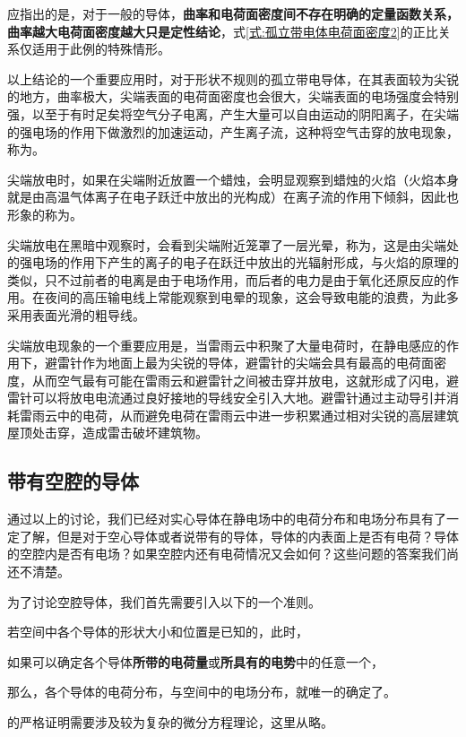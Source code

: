 应指出的是，对于一般的导体，\textbf{曲率和电荷面密度间不存在明确的定量函数关系，曲率越大电荷面密度越大只是定性结论}，式\ref{式:孤立带电体电荷面密度2}的正比关系仅适用于此例的特殊情形。

以上结论的一个重要应用时，对于形状不规则的孤立带电导体，在其表面较为尖锐的地方，曲率极大，尖端表面的电荷面密度也会很大，尖端表面的电场强度会特别强，以至于有时足矣将空气分子电离，产生大量可以自由运动的阴阳离子，在尖端的强电场的作用下做激烈的加速运动，产生离子流，这种将空气击穿的放电现象，称为。

尖端放电时，如果在尖端附近放置一个蜡烛，会明显观察到蜡烛的火焰（火焰本身就是由高温气体离子在电子跃迁中放出的光构成）在离子流的作用下倾斜，因此也形象的称为。

尖端放电在黑暗中观察时，会看到尖端附近笼罩了一层光晕，称为，这是由尖端处的强电场的作用下产生的离子的电子在跃迁中放出的光辐射形成，与火焰的原理的类似，只不过前者的电离是由于电场作用，而后者的电力是由于氧化还原反应的作用。在夜间的高压输电线上常能观察到电晕的现象，这会导致电能的浪费，为此多采用表面光滑的粗导线。

尖端放电现象的一个重要应用是，当雷雨云中积聚了大量电荷时，在静电感应的作用下，避雷针作为地面上最为尖锐的导体，避雷针的尖端会具有最高的电荷面密度，从而空气最有可能在雷雨云和避雷针之间被击穿并放电，这就形成了闪电，避雷针可以将放电电流通过良好接地的导线安全引入大地。避雷针通过主动导引并消耗雷雨云中的电荷，从而避免电荷在雷雨云中进一步积累通过相对尖锐的高层建筑屋顶处击穿，造成雷击破坏建筑物。

\subsection{带有空腔的导体}
通过以上的讨论，我们已经对实心导体在静电场中的电荷分布和电场分布具有了一定了解，但是对于空心导体或者说带有的导体，导体的内表面上是否有电荷？导体的空腔内是否有电场？如果空腔内还有电荷情况又会如何？这些问题的答案我们尚还不清楚。

为了讨论空腔导体，我们首先需要引入以下的一个准则。
\begin{BoxPrinciple}[静电场的唯一性原理]
    若空间中各个导体的形状大小和位置是已知的，此时，

    如果可以确定各个导体\textbf{所带的电荷量}或\textbf{所具有的电势}中的任意一个，

    那么，各个导体的电荷分布，与空间中的电场分布，就唯一的确定了。
\end{BoxPrinciple}
的严格证明需要涉及较为复杂的微分方程理论，这里从略。

